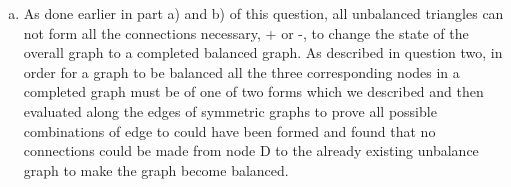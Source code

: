 \documentclass[11pt]{article}
\begin{document}
{\begin{enumerate}[(a)]
\begin{center}
	Figure 3.3.4\\
\end{center}
	\item As done earlier in part a) and b) of this question, all unbalanced triangles can not form all the connections necessary, + or -, to change the state of the overall graph to a completed balanced graph.  As described in question two, in order for a graph to be balanced all the three corresponding nodes in a completed graph must be of one of two forms which we described and then evaluated along the edges of symmetric graphs to prove all possible combinations of edge to could have been formed and found that no connections could be made from node D to the already existing unbalance graph to make the graph become balanced. 
\end{enumerate}}
\end{document}
